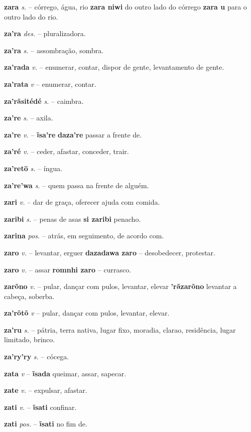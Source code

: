 \textbf{zara} \textit{s.} -- córrego, água, rio  \textbf{zara niwi} do outro lado do córrego  \textbf{zara u} para o outro lado do rio.

\textbf{za'ra} \textit{des.} -- pluralizadora.

\textbf{za'ra} \textit{s.} -- assombração, sombra.

\textbf{za'rada} \textit{v.} -- enumerar, contar, dispor de gente, levantamento de gente.

\textbf{za'rata} \textit{v} -- enumerar, contar.

\textbf{za'rãsitédé} \textit{s.} -- caimbra.

\textbf{za're} \textit{s.} -- axila.

\textbf{za're} \textit{v.} -- \textbf{ĩsa're} \textbf{daza're} passar a frente de.

\textbf{za'ré} \textit{v.} -- ceder, afastar, conceder, trair.

\textbf{za'retö} \textit{s.} -- íngua.

\textbf{za're'wa} \textit{s.} -- quem passa na frente de alguém.

\textbf{zari} \textit{v.} -- dar de graça, oferecer ajuda com comida.

\textbf{zaribi} \textit{s.} -- penas de asas  \textbf{si zaribi} penacho.

\textbf{zarina} \textit{pos.} -- atrás, em seguimento, de acordo com.

\textbf{zaro} \textit{v.} -- levantar, erguer  \textbf{dazadawa zaro} -- desobedecer, protestar.

\textbf{zaro} \textit{v.} -- assar  \textbf{romnhi zaro} -- currasco.

\textbf{zarõno} \textit{v.} -- pular, dançar com pulos, levantar, elevar  \textbf{'rãzarõno} levantar a cabeça, soberba.

\textbf{za'rõtõ} \textit{v} -- pular, dançar com pulos, levantar, elevar.

\textbf{za'ru} \textit{s.} -- pátria, terra nativa, lugar fixo, moradia, clarao, residência, lugar limitado, brinco.

\textbf{za'ry'ry} \textit{s.} -- cócega.

\textbf{zata} \textit{v} -- \textbf{ĩsada} queimar, assar, sapecar.

\textbf{zate} \textit{v.} -- expulsar, afastar.

\textbf{zati} \textit{v.} -- \textbf{ĩsati} confinar.

\textbf{zati} \textit{pos.} -- \textbf{ĩsati} no fim de.

